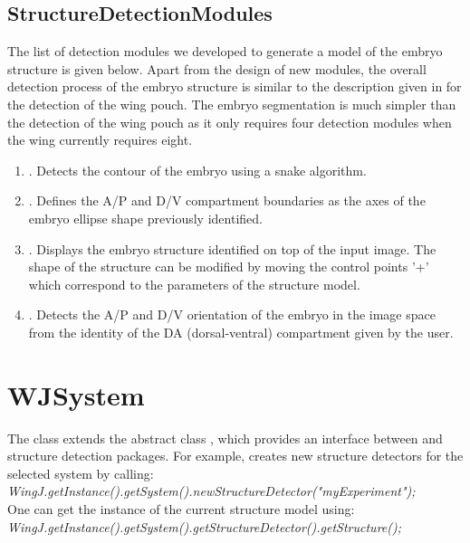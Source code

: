 \subsection{StructureDetectionModules}

The list of detection modules we developed to generate a model of the \droso embryo structure is given below. Apart from the design of new modules, the overall detection process of the embryo structure is similar to the description given in  for the detection of the \droso wing pouch. The embryo segmentation is much simpler than the detection of the wing pouch as it only requires four detection modules when the wing currently requires eight.

\begin{enumerate}
 \item \EmbryoContourDetection. Detects the contour of the embryo using a snake algorithm.
 \item \EmbryoBoundariesDetection. Defines the A/P and D/V compartment boundaries as the axes of the embryo ellipse shape previously identified.
 \item \EmbryoInteractiveStructure. Displays the embryo structure identified on top of the input image. The shape of the structure can be modified by moving the control points '+' which correspond to the parameters of the structure model.
 \item \EmbryoOrientationDetection. Detects the A/P and D/V orientation of the embryo in the image space from the identity of the DA (dorsal-ventral) compartment given by the user.
\end{enumerate}

\section{WJSystem}\label{sec:wing_systems}
The class \WPouchSystem extends the abstract class \WJSystem, which provides an interface between \wingj and structure detection packages. For example, \wingj creates new structure detectors for the selected system by calling:\\
\emph{WingJ.getInstance().getSystem().newStructureDetector("myExperiment");}\\

One can get the instance of the current structure model using:\\
\emph{WingJ.getInstance().getSystem().getStructureDetector().getStructure();}\\

